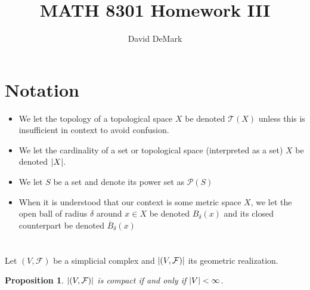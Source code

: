 \documentclass[english]{article}
\title{MATH 8301 Homework III}
\author{David DeMark}
\date{\due}
\DeclarePairedDelimiter\abs{\lvert}{\rvert}%
\newcommand{\prob}[1]{\setcounter{section}{#1-1}\section{}}
\newtheorem*{proposition*}{Proposition}
\theoremstyle{remark}
\theoremstyle{definition}
\newcommand{\PP}{\mathcal{P}}
\newcommand{\Tt}{\mathcal{T}}
\newcommand{\Fcal}{\mathcal{F}}
\begin{document}
	\maketitle
	\section*{Notation}
	\begin{itemize}
		\item We let the topology of a topological space $X$ be denoted $\Tt(X)$ unless this is insufficient in context to avoid confusion.
		\item We let the cardinality of a set or topological space (interpreted as a set) $X$ be denoted $\abs{X}$.
		\item We let $S$ be a set and denote its power set as $\PP(S)$
		\item When it is understood that our context is some metric space $X$, we let the open ball of radius $\delta$ around $x\in X$ be denoted $B_\delta(x)$ and its closed counterpart be denoted $\overline B_\delta(x)$
	\end{itemize}
	\prob{1}Let $(V,\Fcal)$ be a simplicial complex and $\abs{(V,\Fcal)}$ its geometric realization.
	\begin{proposition*}
	 $\abs{(V,\Fcal)}$ is compact if and only if $\abs{V}<\infty$.
	\end{proposition*}
\end{document}
